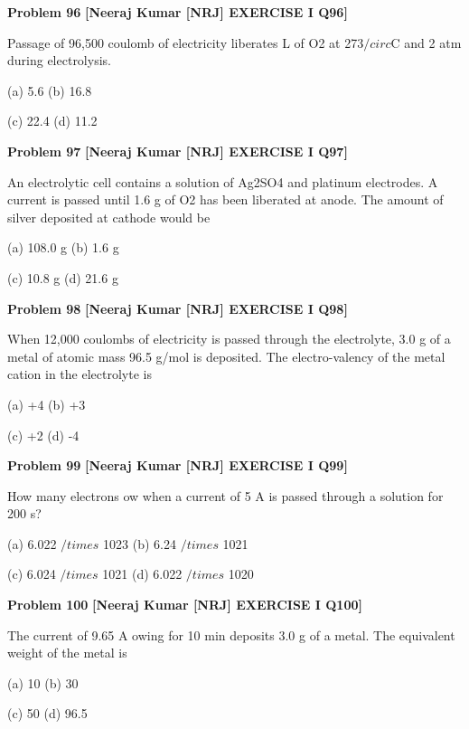 \begin{problembox}
\textbf{Problem 96} \hfill \textbf{[Neeraj Kumar [NRJ] EXERCISE I Q96]}
\label{q:ext-nrj_all_questions-96}

Passage of 96,500 coulomb of electricity liberates 
\underline{\hspace{1cm}} L of O2 at 273$/circ$C and 2  atm during 
electrolysis.
 
 (a) 5.6 
(b) 16.8
 
 (c) 22.4 
(d) 11.2
\end{problembox}

\begin{problembox}
\textbf{Problem 97} \hfill \textbf{[Neeraj Kumar [NRJ] EXERCISE I Q97]}
\label{q:ext-nrj_all_questions-97}

An electrolytic cell contains a solution of Ag2SO4 
and platinum electrodes. A current is passed 
until 1.6 g of O2 has been liberated at anode. The 
amount of silver deposited at cathode would be
 
 (a) 108.0 g 
(b) 1.6 g
 
 (c) 10.8 g 
(d) 21.6 g
\end{problembox}

\begin{problembox}
\textbf{Problem 98} \hfill \textbf{[Neeraj Kumar [NRJ] EXERCISE I Q98]}
\label{q:ext-nrj_all_questions-98}

When 12,000 coulombs of electricity is passed 
through the electrolyte, 3.0 g of a metal of atomic 
mass 96.5 g/mol is deposited. The electro-valency 
of the metal cation in the electrolyte is
 
 (a) +4 
(b) +3
 
 (c) +2 
(d) -4
\end{problembox}

\begin{problembox}
\textbf{Problem 99} \hfill \textbf{[Neeraj Kumar [NRJ] EXERCISE I Q99]}
\label{q:ext-nrj_all_questions-99}

How many electrons   ow when a current of 5 A is 
passed through a solution for 200 s?
 
 (a) 6.022 $/times$ 1023 
(b) 6.24 $/times$ 1021
 
 (c) 6.024 $/times$ 1021 
(d) 6.022 $/times$ 1020
\end{problembox}

\begin{problembox}
\textbf{Problem 100} \hfill \textbf{[Neeraj Kumar [NRJ] EXERCISE I Q100]}
\label{q:ext-nrj_all_questions-100}

The current of 9.65 A   owing for 10 min deposits 
3.0 g of a metal. The equivalent weight of the 
metal is
 
 (a) 10 
(b) 30
 
 (c) 50 
(d) 96.5
\end{problembox}


